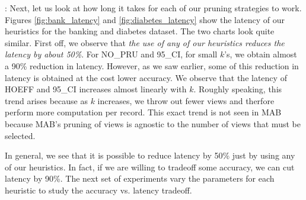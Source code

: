 
:
Next, let us look at how long it takes for each of our pruning strategies to
work.
Figures \ref{fig:bank_latency} and \ref{fig:diabetes_latency} show the latency
of our heuristics for the banking and diabetes dataset.
The two charts look quite similar.
First off, we observe that {\it the use of any of our heuristics reduces the
latency by about 50\%}.
For NO\_PRU and 95\_CI, for small $k$'s, we obtain almost a 90\% reduction in
latency. However, as we saw earlier, some of this reduction in latency is
obtained at the cost lower accuracy.
We observe that the latency of HOEFF and 95\_CI increases almost linearly
with $k$.
Roughly speaking, this trend arises because as $k$
increases, we throw out fewer views and therfore perform more
computation per record.
This exact trend is not seen in MAB because MAB's pruning of views is agnostic
to the number of views that must be selected.

In general, we see that it is possible to reduce latency by 50\% just by using
any of our heuristics.
In fact, if we are willing to tradeoff some accuracy, we can cut latency by
90\%.
The next set of experiments vary the parameters for each heuristic to study
the accuracy vs. latency tradeoff.\\


